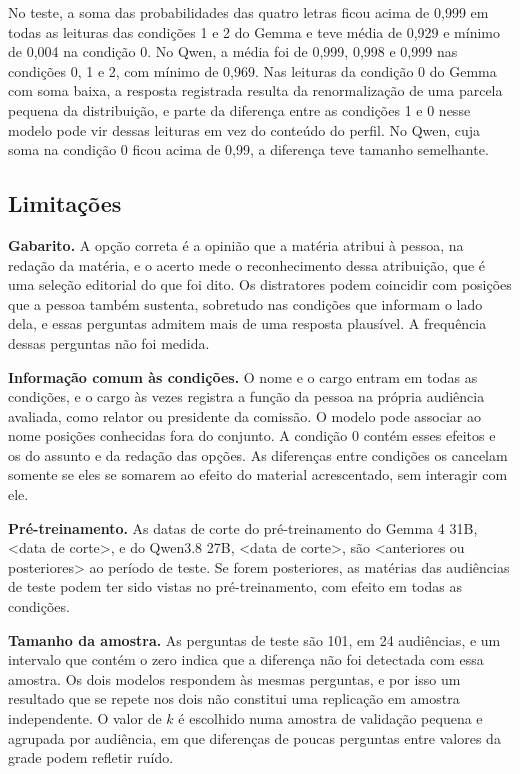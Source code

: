 No teste, a soma das probabilidades das quatro letras ficou acima de 0,999 em todas as leituras das
condições 1 e 2 do Gemma e teve média de 0,929 e mínimo de 0,004 na condição 0. No Qwen, a média foi
de 0,999, 0,998 e 0,999 nas condições 0, 1 e 2, com mínimo de 0,969. Nas leituras da condição 0 do
Gemma com soma baixa, a resposta registrada resulta da renormalização de uma parcela pequena da
distribuição, e parte da diferença entre as condições 1 e 0 nesse modelo pode vir dessas leituras em
vez do conteúdo do perfil. No Qwen, cuja soma na condição 0 ficou acima de 0,99, a diferença teve
tamanho semelhante.


\subsection{Limitações}
\label{sec:limitacoes}

\textbf{Gabarito.} A opção correta é a opinião que a matéria atribui à pessoa, na redação da
matéria, e o acerto mede o reconhecimento dessa atribuição, que é uma seleção editorial do que foi
dito. Os distratores podem coincidir com posições que a pessoa também sustenta, sobretudo nas
condições que informam o lado dela, e essas perguntas admitem mais de uma resposta plausível. A
frequência dessas perguntas não foi medida.

\textbf{Informação comum às condições.} O nome e o cargo entram em todas as condições, e o cargo às
vezes registra a função da pessoa na própria audiência avaliada, como relator ou presidente da
comissão. O modelo pode associar ao nome posições conhecidas fora do conjunto. A condição 0 contém
esses efeitos e os do assunto e da redação das opções. As diferenças entre condições os cancelam
somente se eles se somarem ao efeito do material acrescentado, sem interagir com ele.

\textbf{Pré-treinamento.} As datas de corte do pré-treinamento do Gemma 4 31B, <data de corte>, e do
Qwen3.8 27B, <data de corte>, são <anteriores ou posteriores> ao período de teste. Se forem
posteriores, as matérias das audiências de teste podem ter sido vistas no pré-treinamento, com
efeito em todas as condições.

\textbf{Tamanho da amostra.} As perguntas de teste são 101, em 24 audiências, e um intervalo que
contém o zero indica que a diferença não foi detectada com essa amostra. Os dois modelos respondem
às mesmas perguntas, e por isso um resultado que se repete nos dois não constitui uma replicação em
amostra independente. O valor de $k$ é escolhido numa amostra de validação pequena e agrupada por audiência, em
que diferenças de poucas perguntas entre valores da grade podem refletir ruído.

